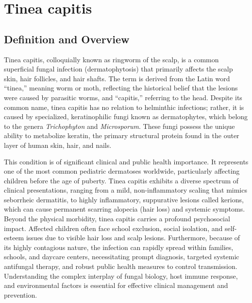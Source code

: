 \chapter{Tinea capitis}

\section*{Definition and Overview}
Tinea capitis, colloquially known as ringworm of the scalp, is a common superficial fungal infection (dermatophytosis) that primarily affects the scalp skin, hair follicles, and hair shafts. The term is derived from the Latin word ``tinea,'' meaning worm or moth, reflecting the historical belief that the lesions were caused by parasitic worms, and ``capitis,'' referring to the head. Despite its common name, tinea capitis has no relation to helminthic infections; rather, it is caused by specialized, keratinophilic fungi known as dermatophytes, which belong to the genera \textit{Trichophyton} and \textit{Microsporum}. These fungi possess the unique ability to metabolize keratin, the primary structural protein found in the outer layer of human skin, hair, and nails.

This condition is of significant clinical and public health importance. It represents one of the most common pediatric dermatoses worldwide, particularly affecting children before the age of puberty. Tinea capitis exhibits a diverse spectrum of clinical presentations, ranging from a mild, non-inflammatory scaling that mimics seborrheic dermatitis, to highly inflammatory, suppurative lesions called kerions, which can cause permanent scarring alopecia (hair loss) and systemic symptoms. Beyond the physical morbidity, tinea capitis carries a profound psychosocial impact. Affected children often face school exclusion, social isolation, and self-esteem issues due to visible hair loss and scalp lesions. Furthermore, because of its highly contagious nature, the infection can rapidly spread within families, schools, and daycare centers, necessitating prompt diagnosis, targeted systemic antifungal therapy, and robust public health measures to control transmission. Understanding the complex interplay of fungal biology, host immune response, and environmental factors is essential for effective clinical management and prevention.

